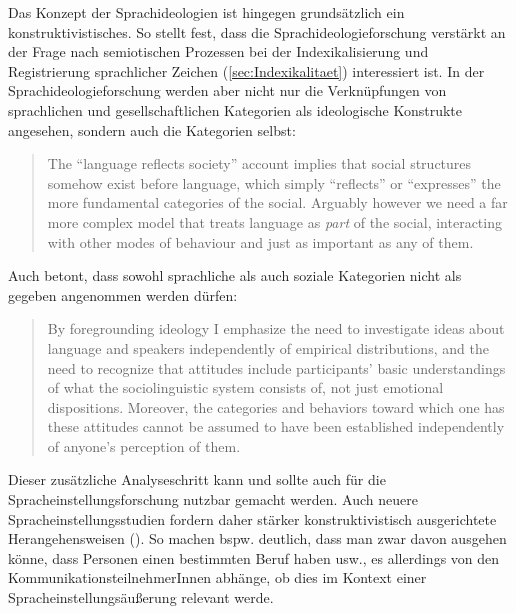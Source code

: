 Das Konzept der Sprachideologien ist hingegen grundsätzlich ein {konstruk\-ti\-vis\-tisches}. 
So stellt \citet[25]{Konig.2014} fest, dass die Sprachideologieforschung verstärkt an der Frage nach semiotischen Prozessen bei der Indexikalisierung und Registrierung sprachlicher Zeichen (\autoref{sec:Indexikalitaet}) interessiert ist. 
In der Sprachideologieforschung werden aber nicht nur die Verknüpfungen von sprachlichen und gesellschaftlichen Kategorien als ideologische Konstrukte angesehen, sondern auch die Kategorien selbst: 
\begin{quote}The “language reflects society” account implies that social structures somehow exist before language, which simply “reflects” or “expresses” the more fundamental categories of the social. Arguably however we need a far more complex model that treats language as \textit{part }of the social, interacting with other modes of behaviour and just as important as any of them. \citep[81--82]{Cameron.1990}
\end{quote}
Auch \citet{Irvine.2005} betont, dass sowohl sprachliche als auch soziale Kategorien nicht als gegeben angenommen werden dürfen: 
\begin{quote}By foregrounding ideology I emphasize the need to investigate ideas about language and speakers independently of empirical distributions, and the need to recognize that {\glq}attitudes{\grq} include participants' basic understandings of what the sociolinguistic system consists of, not just emotional dispositions. Moreover, the categories and behaviors toward which one has these attitudes cannot be assumed to have been established independently of anyone's perception of them.~\citep[24]{Irvine.2005}\end{quote}
Dieser zusätzliche Analyseschritt kann und sollte auch für die Spracheinstellungsforschung nutzbar gemacht werden.  
Auch neuere Spracheinstellungsstudien fordern daher stärker konstruktivistisch ausgerichtete Herangehensweisen (\cites[s.][207]{Tophinke.2006}[195]{Liebscher.2009}[61--62]{Cuonz.2014}).
So machen bspw. \citet[213]{Tophinke.2006} deutlich, dass man zwar davon ausgehen könne, dass Personen einen bestimmten Beruf haben usw., es allerdings von den {Kom\-mu\-ni\-kations\-teil\-neh\-merIn\-nen} abhänge, ob dies im Kontext einer Spracheinstellungsäußerung relevant werde. 

